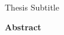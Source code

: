 \thispagestyle{plain}
\makeatletter
\begin{center}
    \Large
    \textbf{\@title}
        
    \vspace{0.4cm}
    \large
    Thesis Subtitle
        
    \vspace{0.4cm}
    \textbf{\@author}
       
    \vspace{0.9cm}
    \textbf{Abstract}
\end{center}
\makeatother

\lipsum[1-1]

